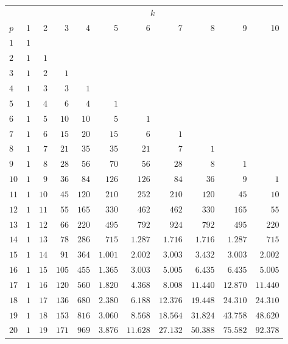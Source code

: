 \documentclass[
  letterpaper,
  DIV=11,
  numbers=noendperiod]{scrreprt}
\begin{document}
\begin{longtable*}{l|rrrrrrrrrr}
\toprule
{} &  \\ 
\cmidrule(lr){2-11}
 & 1 & 2 & 3 & 4 & 5 & 6 & 7 & 8 & 9 & 10 \\ 
\midrule\addlinespace[2.5pt]
$1$ & $1$ &  &  &  &  &  &  &  &  &  \\ 
$2$ & $1$ & $1$ &  &  &  &  &  &  &  &  \\ 
$3$ & $1$ & $2$ & $1$ &  &  &  &  &  &  &  \\ 
$4$ & $1$ & $3$ & $3$ & $1$ &  &  &  &  &  &  \\ 
$5$ & $1$ & $4$ & $6$ & $4$ & $1$ &  &  &  &  &  \\ 
$6$ & $1$ & $5$ & $10$ & $10$ & $5$ & $1$ &  &  &  &  \\ 
$7$ & $1$ & $6$ & $15$ & $20$ & $15$ & $6$ & $1$ &  &  &  \\ 
$8$ & $1$ & $7$ & $21$ & $35$ & $35$ & $21$ & $7$ & $1$ &  &  \\ 
$9$ & $1$ & $8$ & $28$ & $56$ & $70$ & $56$ & $28$ & $8$ & $1$ &  \\ 
$10$ & $1$ & $9$ & $36$ & $84$ & $126$ & $126$ & $84$ & $36$ & $9$ & $1$ \\ 
$11$ & $1$ & $10$ & $45$ & $120$ & $210$ & $252$ & $210$ & $120$ & $45$ & $10$ \\ 
$12$ & $1$ & $11$ & $55$ & $165$ & $330$ & $462$ & $462$ & $330$ & $165$ & $55$ \\ 
$13$ & $1$ & $12$ & $66$ & $220$ & $495$ & $792$ & $924$ & $792$ & $495$ & $220$ \\ 
$14$ & $1$ & $13$ & $78$ & $286$ & $715$ & $1.287$ & $1.716$ & $1.716$ & $1.287$ & $715$ \\ 
$15$ & $1$ & $14$ & $91$ & $364$ & $1.001$ & $2.002$ & $3.003$ & $3.432$ & $3.003$ & $2.002$ \\ 
$16$ & $1$ & $15$ & $105$ & $455$ & $1.365$ & $3.003$ & $5.005$ & $6.435$ & $6.435$ & $5.005$ \\ 
$17$ & $1$ & $16$ & $120$ & $560$ & $1.820$ & $4.368$ & $8.008$ & $11.440$ & $12.870$ & $11.440$ \\ 
$18$ & $1$ & $17$ & $136$ & $680$ & $2.380$ & $6.188$ & $12.376$ & $19.448$ & $24.310$ & $24.310$ \\ 
$19$ & $1$ & $18$ & $153$ & $816$ & $3.060$ & $8.568$ & $18.564$ & $31.824$ & $43.758$ & $48.620$ \\ 
$20$ & $1$ & $19$ & $171$ & $969$ & $3.876$ & $11.628$ & $27.132$ & $50.388$ & $75.582$ & $92.378$ \\ 

\end{longtable*}
\end{document}
